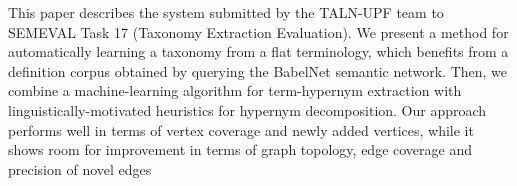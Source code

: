 This paper describes the system submitted by the TALN-UPF team to SEMEVAL Task 17 (Taxonomy Extraction Evaluation). We present a method for automatically learning a taxonomy from a flat terminology, which benefits from a definition corpus obtained by querying the BabelNet semantic network. Then, we combine a machine-learning algorithm for term-hypernym extraction with linguistically-motivated heuristics for hypernym decomposition. Our approach performs well in terms of vertex coverage and newly added vertices, while it shows room for improvement in terms of graph topology, edge coverage and precision of novel edges
